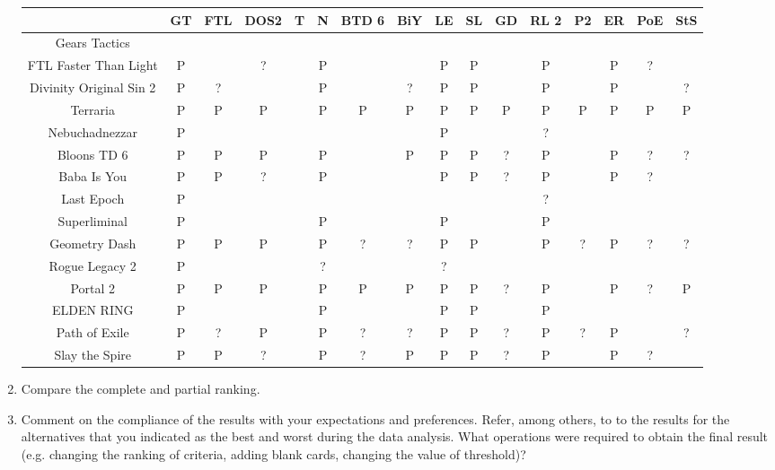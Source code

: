 \documentclass{article}
\begin{document}
\begin{enumerate}
    \begin{center}
    \begin{table}[!ht]
        \begin{tabular}{|c|c|c|c|c|c|c|c|c|c|c|c|c|c|c|c|}
        \hline
            ~ & GT & FTL & DOS2 & T & N & BTD 6 & BiY & LE & SL & GD & RL 2 & P2 & ER & PoE & StS \\
            \hline
            \hline
            Gears Tactics & ~ & ~ & ~ & ~ & ~ & ~ & ~ & ~ & ~ & ~ & ~ & ~ & ~ & ~ & ~ \\ \hline
            FTL Faster Than Light & P & ~ & ? & ~ & P & ~ & ~ & P & P & ~ & P & ~ & P & ? & ~ \\ \hline
            Divinity Original Sin 2 & P & ? & ~ & ~ & P & ~ & ? & P & P & ~ & P & ~ & P & ~ & ? \\ \hline
            Terraria & P & P & P & ~ & P & P & P & P & P & P & P & P & P & P & P \\ \hline
            Nebuchadnezzar & P & ~ & ~ & ~ & ~ & ~ & ~ & P & ~ & ~ & ? & ~ & ~ & ~ & ~ \\ \hline
            Bloons TD 6 & P & P & P & ~ & P & ~ & P & P & P & ? & P & ~ & P & ? & ? \\ \hline
            Baba Is You & P & P & ? & ~ & P & ~ & ~ & P & P & ? & P & ~ & P & ? & ~ \\ \hline
            Last Epoch & P & ~ & ~ & ~ & ~ & ~ & ~ & ~ & ~ & ~ & ? & ~ & ~ & ~ & ~ \\ \hline
            Superliminal & P & ~ & ~ & ~ & P & ~ & ~ & P & ~ & ~ & P & ~ & ~ & ~ & ~ \\ \hline
            Geometry Dash & P & P & P & ~ & P & ? & ? & P & P & ~ & P & ? & P & ? & ? \\ \hline
            Rogue Legacy 2 & P & ~ & ~ & ~ & ? & ~ & ~ & ? & ~ & ~ & ~ & ~ & ~ & ~ & ~ \\ \hline
            Portal 2 & P & P & P & ~ & P & P & P & P & P & ? & P & ~ & P & ? & P \\ \hline
            ELDEN RING & P & ~ & ~ & ~ & P & ~ & ~ & P & P & ~ & P & ~ & ~ & ~ & ~ \\ \hline
            Path of Exile & P & ? & P & ~ & P & ? & ? & P & P & ? & P & ? & P & ~ & ? \\ \hline
            Slay the Spire & P & P & ? & ~ & P & ? & P & P & P & ? & P & ~ & P & ? & ~ \\ \hline
        \end{tabular}
    \end{table}
    \end{center}

    \item Compare the complete and partial ranking.

    \item Comment on the compliance of the results with your expectations and preferences. Refer, among
    others, to to the results for the alternatives that you indicated as the best and worst during the data
    analysis. What operations were required to obtain the final result (e.g. changing the ranking of criteria,
    adding blank cards, changing the value of threshold)?

\end{enumerate}
\end{document}
